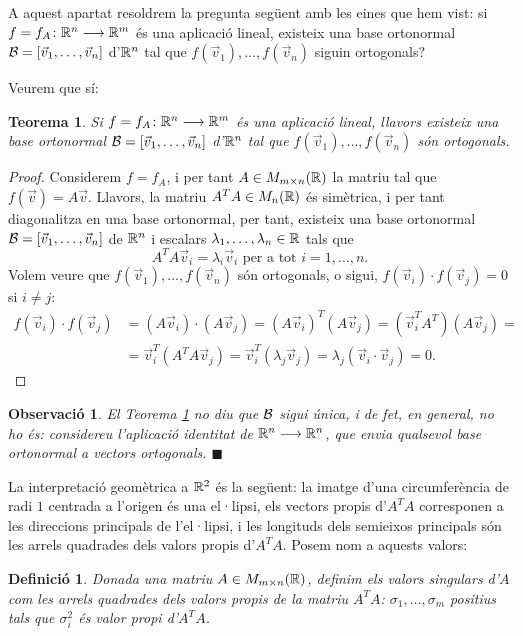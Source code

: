\documentclass[
  11pt,
]{book}
\numberwithin{dummy}{section}
\theoremstyle{maincolornumbox}
\newtheorem{theorem}{TTTT}[chapter]
\newtheorem{theoremeT}{Teorema}[chapter]
\newtheorem{remarkT}{Observació}[chapter]
\theoremstyle{blacknumex}
\theoremstyle{blacknumbox}
\newtheorem{definitionT}{Definició}[chapter]
\theoremstyle{maincolornum}
\renewenvironment{theorem}{\begin{tBox}\begin{theoremeT}}{\end{theoremeT}\end{tBox}}
\newenvironment{definition}{\begin{dBox}\begin{definitionT}}{\end{definitionT}\end{dBox}}
\newenvironment{remark}{\begin{remarkT}}{\hfill{\tiny\ensuremath{\blacksquare}}\end{remarkT}}
\newlength\esp
\begin{document}
A aquest apartat resoldrem la pregunta següent amb les eines que hem
vist: si \(f=f_A\colon \mathbb{R}^n \longrightarrow \mathbb{R}^m\) és una aplicació lineal, existeix
una base ortonormal \(\mathcal{B}=[\vec v_1, \dots, \vec v_n]\) d'\(\mathbb{R}^n\) tal que
\(f(\vec v_1), \dots, f(\vec v_n)\) siguin ortogonals?

Veurem que sí:

\begin{theorem}
\protect\hypertarget{thm:val-sing}{}\label{thm:val-sing}Si \(f=f_A\colon \mathbb{R}^n \longrightarrow \mathbb{R}^m\) és
una aplicació lineal, llavors existeix una base ortonormal
\(\mathcal{B}=[\vec v_1, \dots, \vec v_n]\) d'\(\mathbb{R}^n\) tal que
\(f(\vec v_1), \dots, f(\vec v_n)\) són ortogonals.
\end{theorem}

\begin{proof}
Considerem \(f=f_A\), i per tant \(A\in M_{m\times n}(\mathbb{R})\) la
matriu tal que \(f(\vec v)=A\vec v\). Llavors, la matriu \(A^TA\in M_n(\mathbb{R})\)
és simètrica, i per tant diagonalitza en una base ortonormal, per tant,
existeix una base ortonormal \(\mathcal{B}=[\vec v_1, \dots, \vec v_n]\) de
\(\mathbb{R}^n\) i escalars \(\lambda_1, \dots, \lambda_n\in \mathbb{R}\) tals que
\[A^T A \vec v_i=\lambda_i \vec v_i \text{ per a tot $i=1, \dots, n$.}\]
Volem veure que \(f(\vec v_1), \dots, f(\vec v_n)\) són ortogonals, o
sigui, \(f(\vec v_i)\cdot f(\vec v_j)=0\) si \(i\neq j\): \begin{align*}
f(\vec v_i)\cdot f(\vec v_j) & =(A\vec v_i)\cdot(A\vec v_j)=(A\vec v_i)^T(A\vec v_j)=(\vec v_i^T A^T)(A \vec v_j)= \\
 &  = \vec v_i^T (A^T A \vec v_j)=\vec v_i^T (\lambda_j \vec v_j)=\lambda_j (\vec v_i \cdot \vec v_j)=0 .
\end{align*}
\end{proof}

\begin{remark}
El Teorema \ref{thm:val-sing} no diu que \(\mathcal{B}\) sigui única, i de fet, en
general, no ho és: considereu l'aplicació identitat de \(\mathbb{R}^n \longrightarrow \mathbb{R}^n\),
que envia qualsevol base ortonormal a vectors ortogonals.
\end{remark}

La interpretació geomètrica a \(\mathbb{R}^2\) és la següent: la imatge d'una
circumferència de radi \(1\) centrada a l'origen és una el·lipsi, els
vectors propis d'\(A^TA\) corresponen a les direccions principals de
l'el·lipsi, i les longituds dels semieixos principals són les arrels
quadrades dels valors propis d'\(A^TA\). Posem nom a aquests valors:

\begin{definition}
Donada una matriu \(A\in M_{m\times n}(\mathbb{R})\), definim els \emph{valors
singulars d'\(A\)} com les arrels quadrades dels valors propis de la
matriu \(A^TA\): \(\sigma_1, \dots, \sigma_m\) positius tals que
\(\sigma_i^2\) és valor propi d'\(A^TA\).
\end{definition}
\end{document}
